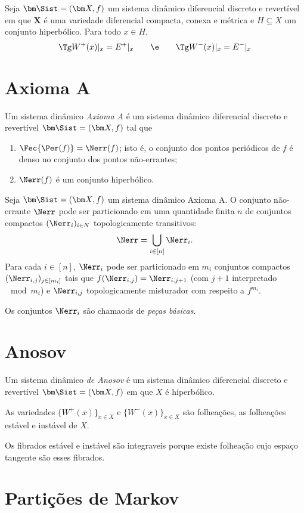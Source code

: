 \begin{proposition}
Seja $\bm\Sist = (\bm X,f)$ um sistema dinâmico diferencial discreto e revertível em que $\bm X$ é uma variedade diferencial compacta, conexa e métrica e $H \subseteq X$ um conjunto hiperbólico. Para todo $x \in H$,
	\begin{equation*}
	\Tg W^+(x)|_x = E^+|_x \qquad\e\qquad \Tg W^-(x)|_x = E^-|_x
	\end{equation*}
\end{proposition}

\section{Axioma A}

\begin{definition}
Um sistema dinâmico \emph{Axioma A} é um sistema dinâmico diferencial discreto e revertível $\bm\Sist = (\bm X,f)$ tal que
	\begin{enumerate}
	\item $\Fec{\Per(f)} = \Nerr(f)$; isto é, o conjunto dos pontos periódicos de $f$ é denso no conjunto dos pontos não-errantes;
	\item $\Nerr(f)$ é um conjunto hiperbólico.
	\end{enumerate}
\end{definition}

\begin{theorem}
Seja $\bm\Sist = (\bm X,f)$ um sistema dinâmico Axioma A. O conjunto não-errante $\Nerr$ pode ser particionado em uma quantidade finita $n$ de conjuntos compactos $(\Nerr_i)_{i \in N}$ topologicamente transitivos:
	\begin{equation*}
	\Nerr = \bigcup_{i \in [n]} \Nerr_i.
	\end{equation*}
Para cada $i \in [n]$, $\Nerr_i$ pode ser particionado em $m_i$ conjuntos compactos $(\Nerr_{i,j})_{j \in [m_i]}$ tais que $f(\Nerr_{i,j}) = \Nerr_{i,j+1}$ (com $j+1$ interpretado $\mod m_i$) e $\Nerr_{i,j}$ topologicamente misturador com respeito a $f^{m_i}$.
\end{theorem}

Os conjuntos $\Nerr_i$ são chamaods de \emph{peças básicas}.

\section{Anosov}

\begin{definition}
Um sistema dinâmico \emph{de Anosov} é um sistema dinâmico diferencial discreto e revertível $\bm\Sist = (\bm X,f)$ em que $X$ é hiperbólico.
\end{definition}


As variedades $\{W^+(x)\}_{x \in X}$ e $\{W^-(x)\}_{x \in X}$ são folheações, as folheações estável e instável de $X$.

Os fibrados estável e instável são integraveis porque existe folheação cujo espaço tangente são esses fibrados.






\section{Partições de Markov}










